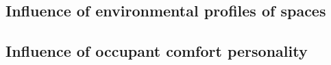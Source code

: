 \subsection{Influence of environmental profiles of spaces}
\label{ch:userResults}





\subsection{Influence of occupant comfort personality}


